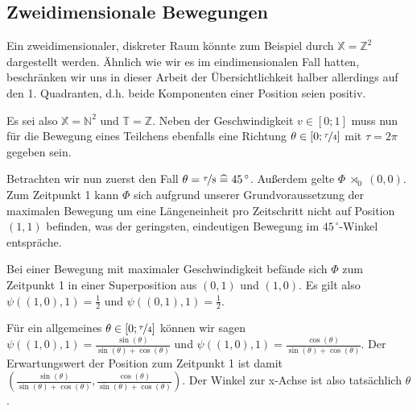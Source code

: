 \documentclass[a4paper,12pt,ngerman]{scrartcl}
\theoremstyle{plain}
\theoremstyle{plain}
\theoremstyle{plain}
\theoremstyle{plain}
\newcommand{\Z}{\mathbb{Z}}
\newcommand{\T}{\mathbb{T}}
\newcommand{\X}{\mathbb{X}}
\newcommand{\N}{\mathbb{N}}
\newcommand{\at}[1]{\;\rtimes_{#1}\;}
\begin{document}


\subsection{Zweidimensionale Bewegungen}

Ein zweidimensionaler, diskreter Raum könnte zum Beispiel durch $\X=\Z^2$ dargestellt werden. Ähnlich wie wir es im eindimensionalen Fall hatten, beschränken wir uns in dieser Arbeit der Übersichtlichkeit halber allerdings auf den 1. Quadranten, d.h. beide Komponenten einer Position seien positiv. 

Es sei also $\X=\N^2$ und $\T=\Z$. Neben der Geschwindigkeit $v\in[0;1]$ muss nun für die Bewegung eines Teilchens ebenfalls eine Richtung $\theta\in[0;\nicefrac{\tau}{4}]$ mit $\tau=2\pi$ gegeben sein.

Betrachten wir nun zuerst den Fall $\theta=\nicefrac{\tau}{8}\;\widehat{=}\;45^{\,\circ}$. Außerdem gelte $\Phi\at{0} (0,0)$. Zum Zeitpunkt 1 kann $\Phi$ sich aufgrund unserer Grundvoraussetzung der maximalen Bewegung um eine Längeneinheit pro Zeitschritt nicht auf Position $(1,1)$ befinden, was der geringsten, eindeutigen Bewegung im $45^{\,\circ}$-Winkel entspräche.

Bei einer Bewegung mit maximaler Geschwindigkeit befände sich $\Phi$ zum Zeitpunkt 1 in einer Superposition aus $(0,1)$ und $(1,0)$. Es gilt also $\psi((1,0),1)=\frac{1}{2}$ und $\psi((0,1),1)=\frac{1}{2}$.

Für ein allgemeines $\theta\in[0;\nicefrac{\tau}{4}]$ können wir sagen $\psi((1,0),1)=\frac{\sin(\theta)}{\sin(\theta)+\cos(\theta)}$ und $\psi((1,0),1)=\frac{\cos(\theta)}{\sin(\theta)+\cos(\theta)}$. Der Erwartungswert der Position zum Zeitpunkt 1 ist damit 
$\left(\frac{\sin(\theta)}{\sin(\theta)+\cos(\theta)},\frac{\cos(\theta)}{\sin(\theta)+\cos(\theta)}\right)$. Der Winkel zur x-Achse ist also tatsächlich $\theta$. 
\end{document}
